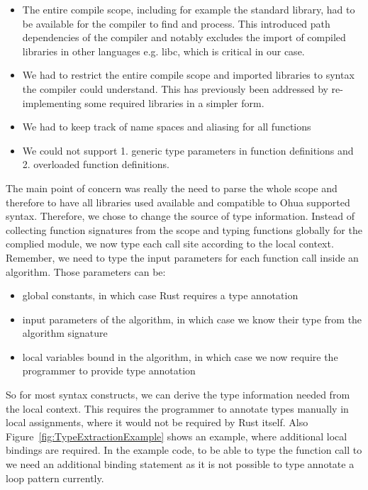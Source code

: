 \begin{itemize}
    \item The entire compile scope, including for example the standard library, had to be available for the compiler to find and process. This introduced path dependencies of the compiler and notably excludes the import of compiled libraries in other languages e.g. libc, which is critical in our case.
    \item We had to restrict the entire compile scope and imported libraries to syntax the compiler could understand. This has previously been addressed by re-implementing some required libraries in a simpler form. 
    \item We had to keep track of name spaces and aliasing for all functions
    \item We could not support 1. generic type parameters in function definitions and 2. overloaded function definitions.
\end{itemize}

The main point of concern was really the need to parse the whole scope and therefore to have all libraries used available and compatible to Ohua supported syntax. Therefore, we chose to change the source of type information. Instead of collecting function signatures from the scope and typing functions globally for the complied module, we now type each call site according to the local context. Remember, we need to type the input parameters for each function call inside an algorithm. Those parameters can be: 

\begin{itemize}
    \item global constants, in which case Rust requires a type annotation
    \item input parameters of the algorithm, in which case we know their type from the algorithm signature
    \item local variables bound in the algorithm, in which case we now require the programmer to provide type annotation 
\end{itemize}

So for most syntax constructs, we can derive the type information needed from the local context. This requires the programmer to annotate types manually in local assignments, where it would not be required by Rust itself. Also Figure~\ref{fig:TypeExtractionExample} shows an example, where additional local bindings are required. In the example code, to be able to type the function call to  we need an additional binding statement as it is not possible to type annotate a loop pattern currently. 

